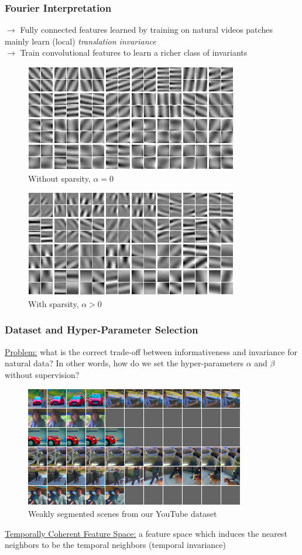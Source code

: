 \documentclass{beamer}
\begin{document}
\begin{frame}
\frametitle{Fourier Interpretation}
$\rightarrow$ Fully connected features learned by training on natural videos patches mainly learn (local) \emph{translation invariance} \\
$\rightarrow$ Train convolutional features to learn a richer class of invariants
\begin{center} 
\begin{figure}
\includegraphics[scale=0.38]{./Figures/Project1/slow_dec_pooling_sub.png}
\caption{Without sparsity, $\alpha = 0$}
\end{figure} 
\begin{figure}
\includegraphics[scale=0.38]{./Figures/Project1/slow_dec_l1_pooling.png}
\caption{With sparsity, $\alpha > 0$}
\end{figure} 
\end{center} 
\end{frame} 

\begin{frame}
\frametitle{Dataset and Hyper-Parameter Selection}
\underline{Problem:} what is the correct trade-off between informativeness and invariance for natural data? In other words, how do we set the hyper-parameters $\alpha$ and $\beta$ without supervision? 
\begin{center} 
\begin{figure}
\includegraphics[scale=0.40]{./Figures/Project1/youtube.png}
\caption{Weakly segmented scenes from our YouTube dataset}
\end{figure}
\end{center}
\underline{Temporally Coherent Feature Space:} a feature space which induces the nearest neighbors to be the temporal neighbors (temporal invariance)   
\end{frame} 
\end{document}
